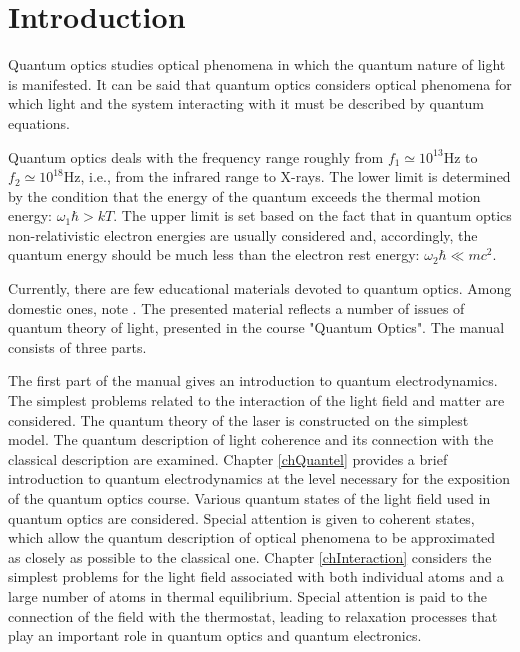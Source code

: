 \chapter*{Introduction}

Quantum optics studies optical phenomena in which the quantum nature of light is manifested. It can be said that quantum optics considers optical phenomena for which light and the system interacting with it must be described by quantum equations.

Quantum optics deals with the frequency range roughly from 
\(f_1 \simeq 10^{13} \mbox{Hz}\) to \(f_2 \simeq 10^{18}
\mbox{Hz}\), i.e., from the infrared range to
X-rays. The lower limit is determined by the condition that the energy of the quantum exceeds the thermal motion energy: 
\(\omega_1 \hbar > k T\). The upper limit is set based on the fact that in quantum optics
non-relativistic electron energies are usually considered and, accordingly, the quantum energy should be much less than the electron rest energy: \(\omega_2 \hbar \ll m c^2\).

Currently, there are few educational materials devoted to quantum optics. Among domestic ones, note \cite{bTarasovQuantumOpticsIntro2008}. The presented material reflects a number of issues of quantum theory of light, presented in the course "Quantum Optics". The manual consists of three parts.

The first part of the manual gives an introduction to quantum electrodynamics. The simplest problems related to the interaction of the light field and matter are considered. The quantum theory of the laser is constructed on the simplest model. The quantum description of light coherence and its connection with the classical description are examined.
Chapter \ref{chQuantel} provides a brief introduction to quantum electrodynamics at the level necessary for the exposition of the quantum optics course. Various quantum states of the light field used in quantum optics are considered. Special attention is given to coherent states, which allow the quantum description of optical phenomena to be approximated as closely as possible to the classical one.
Chapter \ref{chInteraction} considers the simplest problems for the light field associated with both individual atoms and a large number of atoms in thermal equilibrium. Special attention is paid to the connection of the field with the thermostat, leading to relaxation processes that play an important role in quantum optics and quantum electronics.

